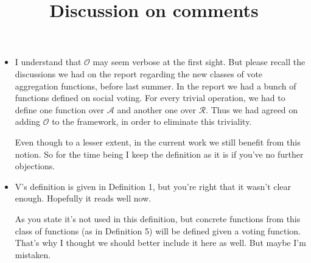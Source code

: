 \documentclass{article}
\date{ }
\newcommand{\args}{\mathcal{A}} %
\newcommand{\att}{\mathcal{R}}  %
\newcommand{\obj}{\mathcal{O}} %
\begin{document}
\date{}
\title{Discussion on comments}
\maketitle



\begin{comment}

\begin{center}
\fbox{\texttt{[image: ./graphs/.png]}}
\end{center}

\begin{itemize} 
\item {\color{blue}
}
\end{itemize}

\end{comment}


\begin{center}
\end{center}

\begin{itemize} 
\item {\color{blue}
 I understand that $\obj$ may seem verbose at the first sight. But please recall the discussions we had on the report regarding the new classes of vote aggregation functions, before last summer. In the report we had a bunch of functions defined on social voting. For every trivial operation, we had to define one function over $\args$ and another one over $\att$. Thus we had agreed on adding $\obj$ to the framework, in order to eliminate this triviality.

  Even though to a lesser extent, in the current work we still benefit from this notion. So for the time being I keep the definition as it is if you've no further objections. 
}
\end{itemize}
\begin{center}
\end{center}

\begin{itemize}
\item {\color{blue} V's definition is given in Definition 1, but you're right that it wasn't clear enough. Hopefully it reads well now.

As you state it's not used in this definition, but concrete functions from this class of functions (as in Definition 5) will be defined given a voting function. That's why I thought we should better include it here as well. But maybe I'm mistaken.
}
\end{itemize}
\begin{center}
\end{center}
\end{document}
